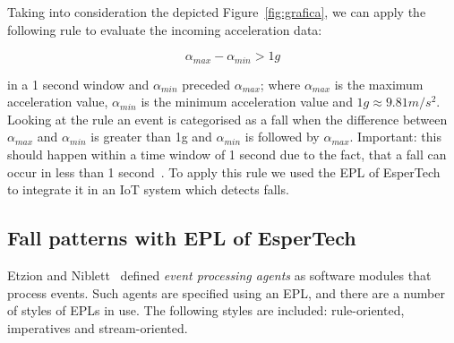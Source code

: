 \documentclass[review]{elsarticle}
\begin{document}
Taking into consideration the depicted Figure~\ref{fig:grafica}, we can apply the following rule to evaluate the incoming acceleration data:

\begin{equation}\label{eq:caida}
 \alpha_{max} - \alpha_{min} > 1g
\end{equation}

in a 1 second window and $\alpha_{min}$ preceded $\alpha_{max}$; where $\alpha_{max}$ is the maximum acceleration value, 
$\alpha_{min}$ is the minimum acceleration value and $1g\approx9.81m/s^{2}$. Looking at the rule an event is categorised as a fall when the 
difference between $\alpha_{max}$ and $\alpha_{min}$ is greater than 1g and $\alpha_{min}$ is followed by $\alpha_{max}$. 
Important: this should happen within a time window of 1 second due to the fact, that a fall can occur in less than 1 second~\cite{Luder2009}.
To apply this rule we used the EPL of EsperTech~\cite{Esper:2016} to integrate it in an IoT system which detects falls.

\subsection{Fall patterns with EPL of EsperTech}

Etzion and Niblett~\cite{Etz10} defined \textit{event processing agents} as software modules that process events. Such agents are specified using an 
EPL, and there are a number of styles of EPLs in use. The following styles are included: rule-oriented, imperatives and stream-oriented.

\end{document}
